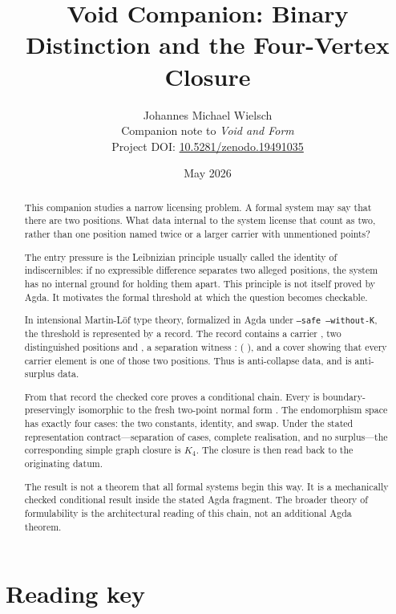 \documentclass[11pt]{article}
\title{Void Companion: Binary Distinction and the Four-Vertex Closure}
\author{Johannes Michael Wielsch\\
\small Companion note to \emph{Void and Form}\\
\small Project DOI: \href{https://doi.org/10.5281/zenodo.19491035}{10.5281/zenodo.19491035}}
\date{May 2026}
\begin{document}
\maketitle

\begin{abstract}
This companion studies a narrow licensing problem.  A formal system may
say that there are two positions.  What data internal to the system
license that count as two, rather than one position named twice or a
larger carrier with unmentioned points?

The entry pressure is the Leibnizian principle usually called the
identity of indiscernibles: if no expressible difference separates two
alleged positions, the system has no internal ground for holding them
apart.  This principle is not itself proved by Agda.  It motivates the
formal threshold at which the question becomes checkable.

In intensional Martin-L\"of type theory, formalized in Agda under
\texttt{--safe --without-K}, the threshold is represented by a
 record.  The record contains a carrier
, two distinguished positions  and
, a separation witness
 : \AgdaSymbol{\ensuremath{\neg}} (
\AgdaSymbol{\ensuremath{\equiv}} ), and a cover
 showing that every carrier element is one of those two
positions.  Thus  is anti-collapse data, and
 is anti-surplus data.

From that record the checked core proves a conditional chain.  Every
 is boundary-preservingly isomorphic to the
fresh two-point normal form .  The endomorphism space
 \AgdaSymbol{\ensuremath{\to}} 
has exactly four cases: the two constants, identity, and swap.  Under
the stated representation contract---separation of cases, complete
realisation, and no surplus---the corresponding simple graph closure is
$K_4$.  The closure is then read back to the originating
 datum.

The result is not a theorem that all formal systems begin this way.  It
is a mechanically checked conditional result inside the stated Agda
fragment.  The broader theory of formulability is the architectural
reading of this chain, not an additional Agda theorem.
\end{abstract}

\section*{Reading key}
\end{document}
